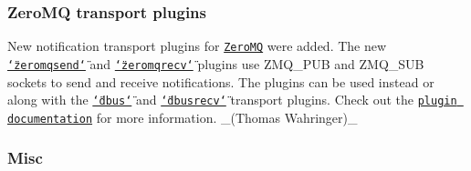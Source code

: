 \subsubsection*{Zero\+MQ transport plugins}


\begin{DoxyItemize}
\item New notification transport plugins for \href{http://zeromq.org/}{\tt Zero\+MQ} were added. The new \href{https://www.libelektra.org/plugins/zeromqsend}{\tt \char`\"{}zeromqsend\char`\"{}} and \href{https://www.libelektra.org/plugins/zeromqrecv}{\tt \char`\"{}zeromqrecv\char`\"{}} plugins use {\ttfamily Z\+M\+Q\+\_\+\+P\+UB} and {\ttfamily Z\+M\+Q\+\_\+\+S\+UB} sockets to send and receive notifications. The plugins can be used instead or along with the \href{https://www.libelektra.org/plugins/dbus}{\tt \char`\"{}dbus\char`\"{}} and \href{https://www.libelektra.org/plugins/dbusrecv}{\tt \char`\"{}dbusrecv\char`\"{}} transport plugins. Check out the \href{https://www.libelektra.org/plugins/zeromqrecv}{\tt plugin documentation} for more information. \+\_\+(\+Thomas Wahringer)\+\_\+
\end{DoxyItemize}

\subsubsection*{Misc}


